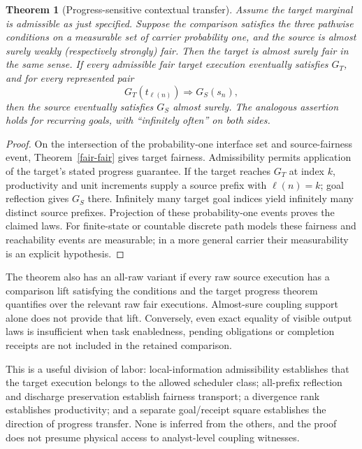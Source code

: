 \documentclass[11pt]{article}
\newtheorem{theorem}{Theorem}\newtheorem{proposition}{Proposition}
\begin{document}
\begin{theorem}[Progress-sensitive contextual transfer]\label{fair-progress}
Assume the target marginal is admissible as just specified. Suppose the comparison satisfies the three pathwise conditions on a measurable set of carrier probability one, and the source is almost surely weakly (respectively strongly) fair. Then the target is almost surely fair in the same sense. If every admissible fair target execution eventually satisfies $G_T$, and for every represented pair
\[
 G_T(t_{\ell(n)})\Longrightarrow G_S(s_n),
\]
then the source eventually satisfies $G_S$ almost surely. The analogous assertion holds for recurring goals, with ``infinitely often'' on both sides.
\end{theorem}
\begin{proof}
On the intersection of the probability-one interface set and source-fairness event, Theorem~\ref{fair-fair} gives target fairness. Admissibility permits application of the target's stated progress guarantee. If the target reaches $G_T$ at index $k$, productivity and unit increments supply a source prefix with $\ell(n)=k$; goal reflection gives $G_S$ there. Infinitely many target goal indices yield infinitely many distinct source prefixes. Projection of these probability-one events proves the claimed laws. For finite-state or countable discrete path models these fairness and reachability events are measurable; in a more general carrier their measurability is an explicit hypothesis.
\end{proof}

The theorem also has an all-raw variant if every raw source execution has a comparison lift satisfying the conditions and the target progress theorem quantifies over the relevant raw fair executions. Almost-sure coupling support alone does not provide that lift. Conversely, even exact equality of visible output laws is insufficient when task enabledness, pending obligations or completion receipts are not included in the retained comparison.

This is a useful division of labor: local-information admissibility establishes that the target execution belongs to the allowed scheduler class; all-prefix reflection and discharge preservation establish fairness transport; a divergence rank establishes productivity; and a separate goal/receipt square establishes the direction of progress transfer. None is inferred from the others, and the proof does not presume physical access to analyst-level coupling witnesses.
\end{document}
